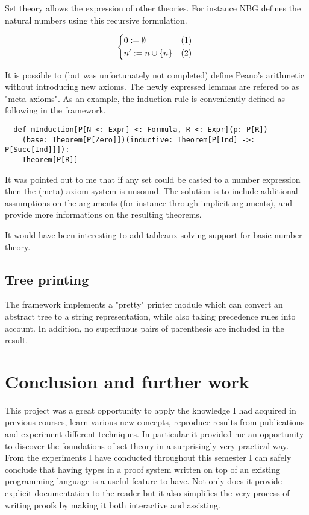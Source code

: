 \documentclass[acmlarge]{acmart}
\begin{document}
Set theory allows the expression of other theories. For instance NBG defines the natural numbers using this recursive formulation.

\[
\begin{dcases*}
0 := \emptyset & (1) \\
n' := n \cup \{n\} & (2) \\
\end{dcases*}
\]

It is possible to (but was unfortunately not completed) define Peano's arithmetic without introducing new axioms. The newly expressed lemmas are refered to as "meta axioms". As an example, the induction rule is conveniently defined as following in the framework.

\begin{verbatim}
  def mInduction[P[N <: Expr] <: Formula, R <: Expr](p: P[R])
    (base: Theorem[P[Zero]])(inductive: Theorem[P[Ind] ->: P[Succ[Ind]]]):
    Theorem[P[R]]
\end{verbatim}

It was pointed out to me that if any set could be casted to a number expression then the (meta) axiom system is unsound. The solution is to include additional assumptions on the arguments (for instance through implicit arguments), and provide more informations on the resulting theorems.

It would have been interesting to add tableaux solving support for basic number theory.

\subsection{Tree printing}

The framework implements a "pretty" printer module which can convert an abstract tree to a string representation, while also taking precedence rules into account. In addition, no superfluous pairs of parenthesis are included in the result.

\section{Conclusion and further work}

This project was a great opportunity to apply the knowledge I had acquired in previous courses, learn various new concepts, reproduce results from publications and experiment different techniques. In particular it provided me an opportunity to discover the foundations of set theory in a surprisingly very practical way.
From the experiments I have conducted throughout this semester I can safely conclude that having types in a proof system written on top of an existing programming language is a useful feature to have. Not only does it provide explicit documentation to the reader but it also simplifies the very process of writing proofs by making it both interactive and assisting.
\end{document}
